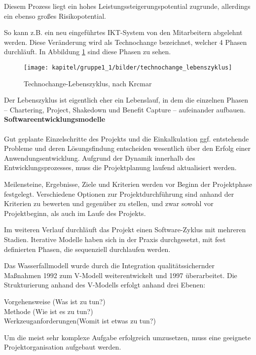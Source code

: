 Diesem Prozess liegt ein hohes Leistungssteigerungspotential zugrunde, allerdings ein ebenso großes Risikopotential. 

So kann z.B. ein neu eingeführtes IKT-System von den Mitarbeitern abgelehnt werden. Diese Veränderung wird als Technochange bezeichnet, welcher 4 Phasen durchläuft. In Abbildung \ref{fig_technochange_lebenszyklus} sind diese Phasen zu sehen.
\begin{figure}
	\centering
	\texttt{[image: kapitel/gruppe1\_1/bilder/technochange\_lebenszyklus]}
	\caption{Technochange-Lebenszyklus, nach Krcmar}
	\label{fig_technochange_lebenszyklus}
\end{figure}
Der Lebenszyklus ist eigentlich eher ein Lebenslauf, in dem die einzelnen Phasen – Chartering, Project, Shakedown und Benefit Capture – aufeinander aufbauen.\\

\textbf{Softwareentwicklungsmodelle}\\\\
Gut geplante Einzelschritte des Projekts und die Einkalkulation ggf. entstehende Probleme und deren Lösungsfindung entscheiden wesentlich über den Erfolg einer Anwendungsentwicklung.
Aufgrund der Dynamik innerhalb des Entwicklungsprozesses, muss die Projektplanung laufend aktualisiert werden.

Meilensteine, Ergebnisse, Ziele und Kriterien werden vor Beginn der Projektphase festgelegt. Verschiedene Optionen zur Projektdurchführung sind anhand der Kriterien zu bewerten und gegenüber zu stellen, und zwar sowohl vor Projektbeginn, als auch im Laufe des Projekts.

Im weiteren Verlauf durchläuft das Projekt einen Software-Zyklus mit mehreren Stadien.  Iterative Modelle haben sich in der Praxis durchgesetzt, mit fest definierten Phasen, die sequenziell durchlaufen werden.

Das Wasserfallmodell wurde durch die Integration qualitätssichernder Maßnahmen 1992 zum V-Modell weiterentwickelt und 1997 überarbeitet. Die Strukturierung anhand des V-Modells erfolgt anhand drei Ebenen:

Vorgehensweise (Was ist zu tun?)\\
Methode (Wie ist es zu tun?)\\
Werkzeuganforderungen(Womit ist etwas zu tun?)

Um die meist sehr komplexe Aufgabe erfolgreich umzusetzen, muss eine geeignete Projektorganisation aufgebaut werden.

